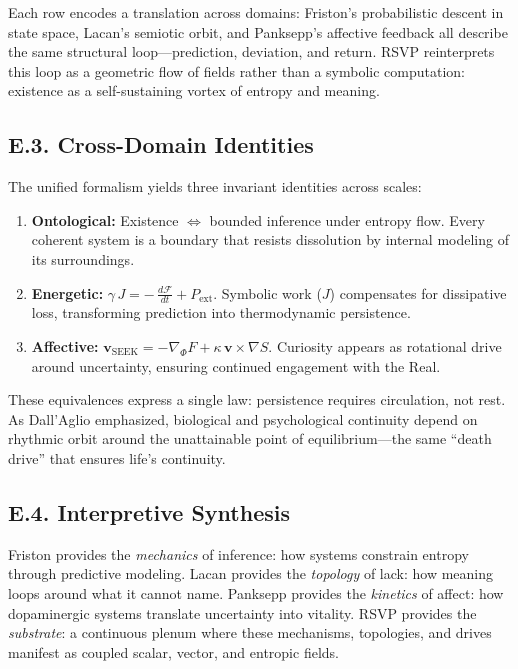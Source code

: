 \documentclass[12pt,a4paper]{article}
\begin{document}
\noindent
Each row encodes a translation across domains:
Friston’s probabilistic descent in state space, Lacan’s semiotic orbit, and Panksepp’s affective feedback all describe the same structural loop—prediction, deviation, and return.
RSVP reinterprets this loop as a geometric flow of fields rather than a symbolic computation: existence as a self-sustaining vortex of entropy and meaning.

\subsection*{E.3. Cross-Domain Identities}

The unified formalism yields three invariant identities across scales:
\begin{enumerate}[leftmargin=1.2em]
\item \textbf{Ontological:}
Existence $\Leftrightarrow$ bounded inference under entropy flow.  
Every coherent system is a boundary that resists dissolution by internal modeling of its surroundings.
\item \textbf{Energetic:}
$\gamma\,J = -\,\frac{d\mathcal{F}}{dt} + P_{\text{ext}}$.  
Symbolic work (\(J\)) compensates for dissipative loss, transforming prediction into thermodynamic persistence.
\item \textbf{Affective:}
$\mathbf{v}_{\text{SEEK}} = -\nabla_{\Phi}F + \kappa\,\mathbf{v}\!\times\!\nabla S$.  
Curiosity appears as rotational drive around uncertainty, ensuring continued engagement with the Real.
\end{enumerate}

These equivalences express a single law: persistence requires circulation, not rest.  
As Dall’Aglio emphasized, biological and psychological continuity depend on rhythmic orbit around the unattainable point of equilibrium—the same “death drive” that ensures life’s continuity.

\subsection*{E.4. Interpretive Synthesis}

Friston provides the \emph{mechanics} of inference: how systems constrain entropy through predictive modeling.
Lacan provides the \emph{topology} of lack: how meaning loops around what it cannot name.
Panksepp provides the \emph{kinetics} of affect: how dopaminergic systems translate uncertainty into vitality.
RSVP provides the \emph{substrate}: a continuous plenum where these mechanisms, topologies, and drives manifest as coupled scalar, vector, and entropic fields.
\end{document}
